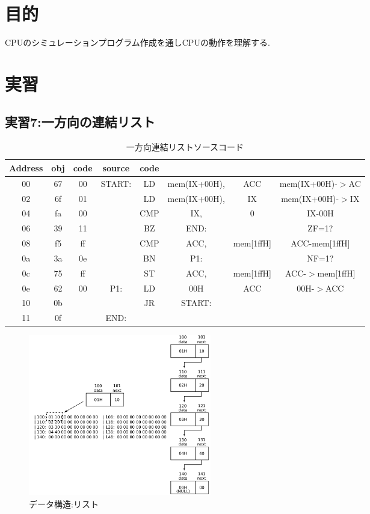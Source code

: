 \documentclass[dvipdfmx]{jsarticle}
\begin{document}
    \section{目的}
  CPUのシミュレーションプログラム作成を通しCPUの動作を理解する.
    \section{実習}
      \subsection{実習7:一方向の連結リスト}

      \begin{table}[h]
        \centering
        \caption{一方向連結リストソースコード}
        \label{tab:list}
        \begin{tabular}{c|cc|cc|ccc}
          \hline \hline
          Address & obj & code & source  & code &  &  &  \\ \hline
          00 & 67 & 00 & START: & LD & mem(IX+00H), & ACC & mem(IX+00H)-$>$AC\\
          02 & 6f & 01 &  & LD & mem(IX+00H), & IX & mem(IX+00H)-$>$IX \\
          04 & fa & 00 &  & CMP & IX, & 0 & IX-00H \\
          06 & 39 & 11 &  & BZ & END: &  & ZF=1? \\
          08 & f5 & ff &  & CMP & ACC, & mem[1ffH] & ACC-mem[1ffH] \\
          0a & 3a & 0e &  & BN & P1: &  & NF=1? \\
          0c & 75 & ff &  & ST & ACC, & mem[1ffH] & ACC-$>$mem[1ffH] \\
          0e & 62 & 00 & P1: & LD & 00H & ACC & 00H-$>$ACC \\
          10 & 0b &  &  & JR & START: &  &  \\
          11 & 0f &  & END: &  &  &  &  \\ \hline

        \end{tabular}
      \end{table}

\begin{figure}[h]
  \centering
  \includegraphics[width=8cm]{7_list.pdf}
  \caption{データ構造:リスト}
  \label{fig:7_list}
\end{figure}
\end{document}
